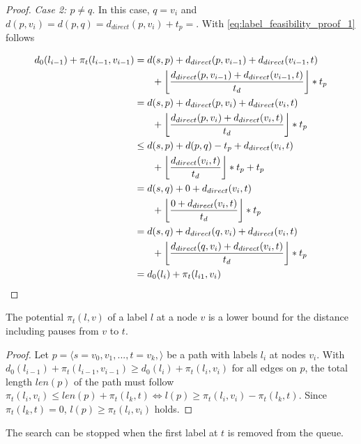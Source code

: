 \begin{proof}
	\emph{Case 2: $p \neq q$}. In this case, $q = v_i$ and $d(p,v_i) = d(p,q) = d_{direct}(p,v_i) + t_p = $. With \ref{eq:label_feasibility_proof_1} follows

	\begin{align}
		\begin{split}\label{eq:label_feasibility_proof_4}
			d_0(l_{i-1}) + \pi_t(l_{i-1},v_{i-1}) &= d(s,p) + d_{direct}(p,v_{i-1}) + d_{direct}(v_{i-1},t)\\
			& \phantom{{}=1} + \floor*{ \frac{d_{direct}(p,v_{i-1}) + d_{direct}(v_{i-1},t)}{t_d} } * t_p\\
			&= d(s,p) + d_{direct}(p,v_{i}) + d_{direct}(v_{i},t)\\
			& \phantom{{}=1} + \floor*{ \frac{d_{direct}(p,v_{i}) + d_{direct}(v_{i},t)}{t_d} } * t_p\\
			&\le d(s,p) + d(p,q) - t_p + d_{direct}(v_{i},t)\\
			& \phantom{{}=1} + \floor*{ \frac{d_{direct}(v_{i},t)}{t_d} } * t_p + t_p\\
			&= d(s,q) + 0 + d_{direct}(v_{i},t)\\
			& \phantom{{}=1} + \floor*{ \frac{0 + d_{direct}(v_{i},t)}{t_d} } * t_p\\
			&= d(s,q) + d_{direct}(q,v_{i}) + d_{direct}(v_{i},t)\\
			& \phantom{{}=1} + \floor*{ \frac{d_{direct}(q,v_{i}) + d_{direct}(v_{i},t)}{t_d} } * t_p\\
			&= d_0(l_{i}) + \pi_t(l_{i1},v_{i})
		\end{split}
	\end{align}
\end{proof}

\begin{lemma}\label{lemma:pot_lower_bound_csp}
	The potential $\pi_t(l,v)$ of a label $l$ at a node $v$ is a lower bound for the distance including pauses from $v$ to $t$.
\end{lemma}

\begin{proof}
	Let $p = \langle s=v_0,v_1,...,t=v_k, \rangle$ be a path with labels $l_i$ at nodes $v_i$. With $d_0(l_{i-1}) + \pi_t(l_{i-1},v_{i-1}) \ge d_0(l_{i}) + \pi_t(l_i,v_i)$ for all edges on $p$, the total length $len(p)$ of the path must follow $\pi_t(l_i,v_i) \le len(p) + \pi_t(l_k,t) \Leftrightarrow l(p) \ge \pi_t(l_i,v_i) - \pi_t(l_k,t)$. Since $\pi_t(l_k,t) = 0$, $l(p) \ge \pi_t(l_i,v_i)$ holds.
\end{proof}

\begin{theorem}\label{theorem:pot_stop_criterion}
	The search can be stopped when the first label at $t$ is removed from the queue.
\end{theorem}

